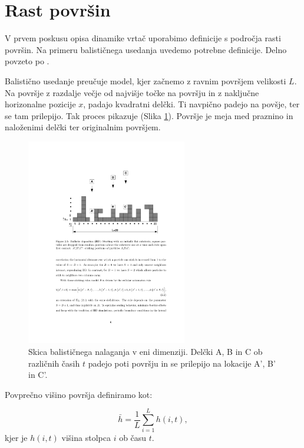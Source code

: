 \documentclass[a4paper, twoside, 12pt]{book}
\begin{document}
  \section{Rast površin}
  \label{definicije}

  V prvem poskusu opisa dinamike vrtač uporabimo definicije s področja rasti površin. Na primeru balističnega usedanja uvedemo potrebne definicije. Delno povzeto po \cite{barabasi1995fractal}.

Balistično usedanje preučuje model, kjer začnemo z ravnim površjem velikosti $L$. Na površje z razdalje večje od najvišje točke na površju in z naključne horizonalne pozicije $x$, padajo kvadratni delčki. Ti navpično padejo na povšje, ter se tam prilepijo. Tak proces pikazuje (Slika \ref{fig:bdep}).
Površje je meja med praznino in naloženimi delčki ter originalnim površjem.

    \begin{figure}[h]
      \begin{center}
        \includegraphics[width=7cm]{slike/bdep}
      \end{center}
      \caption{Skica balističnega nalaganja v eni dimenziji. Delčki A, B in C ob različnih časih $t$ padejo poti površju in se prilepijo na lokacije A’, B’ in C’.}
      \label{fig:bdep}
    \end{figure}

Povprečno višino površja definiramo kot:

  \begin{equation}
    \bar{h} = \frac{1}{L} \sum_{i=1}^L h(i,t),
    \label{povprecna-visina}
  \end{equation}
kjer je $h(i,t)$ višina stolpca $i$ ob času $t$.
\end{document}
